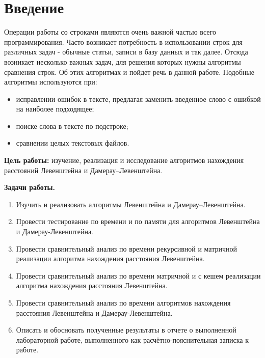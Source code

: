 \chapter*{Введение}

Операции работы со строками являются очень важной частью всего программирования. Часто возникает потребность в использовании строк для различных задач - обычные статьи, записи в базу данных и так далее. Отсюда возникает несколько важных задач, для решения которых нужны алгоритмы сравнения строк. Об этих алгоритмах и пойдет речь в данной работе. 
Подобные алгоритмы используются при:
\begin{itemize}
	\item исправлении ошибок в тексте, предлагая заменить введенное слово с ошибкой на наиболее подходящее;
    \item поиске слова в тексте по подстроке;
    \item сравнении целых текстовых файлов. \newline
\end{itemize}



\textbf{Цель работы:} изучение, реализация и исследование алгоритмов нахождения расстояний Левенштейна и Дамерау--Левенштейна. \newline

\textbf{Задачи работы.}
\begin{enumerate}
	\item Изучить и реализовать алгоритмы Левенштейна и Дамерау--Левенштейна.
    \item Провести тестирование по времени и по памяти для алгоритмов Левенштейна и Дамерау-Левенштейна. 
    \item Провести сравнительный анализ по времени рекурсивной и матричной реализации алгоритма нахождения расстояния Левенштейна.
    \item Провести сравнительный анализ по времени матричной и с кешем реализации алгоритма нахождения расстояния Левенштейна.
    \item Провести сравнительный анализ по времени алгоритмов нахождения расстояния Левенштейна и Дамерау-Левенштейна.
	\item Описать и обосновать полученные результаты в отчете о выполненной лабораторной работе, выполненного как расчётно-пояснительная записка к работе.
\end{enumerate}
